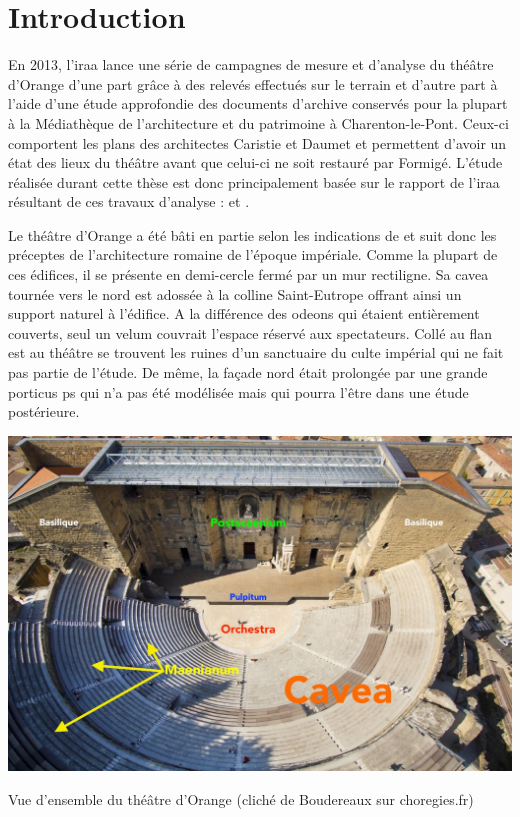 		\section{Introduction}
		
		En 2013, l'\gls{iraa} lance une série de campagnes de mesure et d'analyse du théâtre d'Orange d'une part grâce à des relevés effectués sur le terrain et d'autre part à l'aide d'une étude approfondie des documents d'archive conservés pour la plupart à la Médiathèque de l'architecture et du patrimoine à Charenton-le-Pont. Ceux-ci comportent les plans des architectes Caristie et Daumet et permettent d'avoir un état des lieux du théâtre avant que celui-ci ne soit restauré par Formigé. L'étude réalisée durant cette thèse est donc principalement basée sur le rapport de l'\gls{iraa} résultant de ces travaux d'analyse : \cite{orangeTxt} et \citep{orangePl}.
		
		Le théâtre d'Orange a été bâti en partie selon les indications de \cite{vitruve} et suit donc les préceptes de l'architecture romaine de l'époque impériale. Comme la plupart de ces édifices, il se présente en demi-cercle fermé par un mur rectiligne. Sa \gls{cavea} tournée vers le nord est adossée à la colline Saint-Eutrope offrant ainsi un support naturel à l'édifice. A la différence des \glspl{odeon} qui étaient entièrement couverts, seul un \gls{velum} couvrait l'espace réservé aux spectateurs. Collé au flan est au théâtre se trouvent les ruines d'un sanctuaire du culte impérial qui ne fait pas partie de l'étude. De même, la façade nord était prolongée par une grande \gls{porticus ps} qui n'a pas été modélisée mais qui pourra l'être dans une étude postérieure. 

	\begin{figureth}
			\includegraphics[width=\linewidth]{images/vuensemble}
			\caption[Vue d'ensemble du théâtre d'Orange]{Vue d'ensemble du théâtre d'Orange (cliché de Boudereaux sur choregies.fr)}
	\end{figureth}


